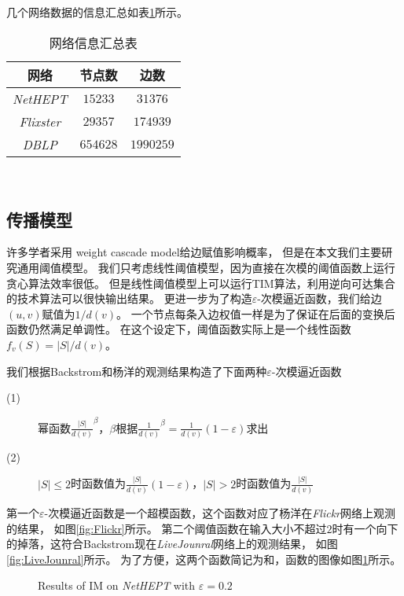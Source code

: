 几个网络数据的信息汇总如表\ref{tab:net_info}所示。
\begin{table}[h]
	\centering
	\caption{网络信息汇总表}
	\label{tab:net_info}
	\begin{minipage}[t]{0.8\textwidth} 
		\centering
		\begin{tabular}{|c|c|c|}
			\hline
			网络  &  节点数   &   边数\\ \hline
			{\em NetHEPT}  &  $15233$   &   $31376$ \\ \hline
			{\em Flixster}  &  $29357$   &   $174939$ \\ \hline
			{\em DBLP}   &   $654628$   &   $1990259$ \\
			\hline
		\end{tabular}\\[2pt]
	\end{minipage}
\end{table}

\subsection{传播模型}
许多学者采用 weight cascade model\cite{Kempe2003maximizing}给边赋值影响概率，
但是在本文我们主要研究通用阈值模型。
我们只考虑线性阈值模型\cite{Kempe2003maximizing}，因为直接在次模的阈值函数上运行贪心算法效率很低。
但是线性阈值模型上可以运行TIM算法，利用逆向可达集合的技术算法可以很快输出结果。
更进一步为了构造$\varepsilon$-次模逼近函数，我们给边$(u,v)$赋值为$1/d(v)$。
一个节点每条入边权值一样是为了保证在后面的变换后函数仍然满足单调性。
在这个设定下，阈值函数实际上是一个线性函数$f_v(S) = |S|/d(v)$。

我们根据Backstrom\cite{backstrom2006group}和杨洋\cite{yang2016role}的观测结果构造了下面两种$\varepsilon$-次模逼近函数
\begin{description}
\item[(1)] 幂函数$\frac{|S|}{d(v)}^{\beta}$，$\beta$根据$\frac{1}{d(v)}^{\beta}=\frac{1}{d(v)}(1-\varepsilon)$求出
\item[(2)] $|S| \leq 2$时函数值为$\frac{|S|}{d(v)}(1-\varepsilon)$，$|S| > 2$时函数值为$\frac{|S|}{d(v)}$
\end{description}
第一个$\varepsilon$-次模逼近函数是一个超模函数，这个函数对应了杨洋\cite{yang2016role}在{\em Flickr}网络上观测的结果，
如图\ref{fig:Flickr}所示。
第二个阈值函数在输入大小不超过$2$时有一个向下的掉落，这符合Backstrom\cite{backstrom2006group}现在{\em LiveJounral}网络上的观测结果，
如图\ref{fig:LiveJounral}所示。
为了方便，这两个函数简记为\easso 和\easst ，函数的图像如图\ref{fig:eas12}所示。
\begin{figure}[h]
\centering
	\caption{Results of IM on {\em NetHEPT} with $\varepsilon=0.2$}
	\label{fig:eas12}
\end{figure}

